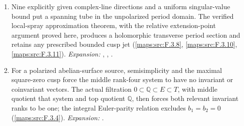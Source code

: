 \begin{enumerate}[label=\arabic*.,leftmargin=*]
\item\hypertarget{step-V-F-5}{} Nine explicitly given complex-line directions and a uniform
  singular-value bound put a spanning tube in the unpolarized period
  domain.  The verified local-spray approximation theorem, with the
  relative extension-point argument proved here, produces a
  holomorphic transverse period section and retains any prescribed
  bounded cusp jet (\cref{maps:src:F.3.8}, \cref{maps:src:F.3.10}, \cref{maps:src:F.3.11}).
\textit{Expansion:} , , .
\item\hypertarget{step-V-F-6}{} For a polarized abelian-surface source, semisimplicity and the
  maximal square-zero cusp force the middle rank-four system to have
  no invariant or coinvariant vectors.  The actual filtration
  $0\subset\mathbb Q\subset E\subset T$, with middle quotient that
  system and top quotient $\mathbb Q$, then forces both relevant
  invariant ranks to be one; the integral Euler-parity relation
  excludes $b_1=b_2=0$ (\cref{maps:src:F.3.4}).
\textit{Expansion:} .
\end{enumerate}

